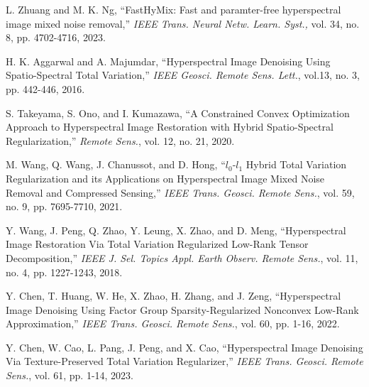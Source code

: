\begin{thebibliography}{100}
	 L. Zhuang and M. K. Ng, ``FastHyMix: Fast and paramter-free hyperspectral image mixed noise removal,'' \textit{IEEE Trans. Neural Netw. Learn. Syst.,} vol. 34, no. 8, pp. 4702-4716, 2023.
	
	
	 H. K. Aggarwal and A. Majumdar, ``Hyperspectral Image Denoising Using Spatio-Spectral Total Variation,'' \textit{IEEE Geosci. Remote Sens. Lett.}, vol.13, no. 3, pp. 442-446, 2016.
	
	 S. Takeyama, S. Ono, and I. Kumazawa, ``A Constrained Convex Optimization Approach to Hyperspectral Image Restoration with Hybrid Spatio-Spectral Regularization,'' \textit{Remote Sens.}, vol. 12, no. 21, 2020.
	
	 M. Wang, Q. Wang, J. Chanussot, and D. Hong, ``$l_0$-$l_1$ Hybrid Total Variation Regularization and its Applications on Hyperspectral Image Mixed Noise Removal and Compressed Sensing,'' \textit{IEEE Trans. Geosci. Remote Sens.}, vol. 59, no. 9, pp. 7695-7710, 2021. 
	
	 Y. Wang, J. Peng, Q. Zhao, Y. Leung, X. Zhao, and D. Meng, ``Hyperspectral Image Restoration Via Total Variation Regularized Low-Rank Tensor Decomposition,'' \textit{IEEE J. Sel. Topics Appl. Earth Observ. Remote Sens.}, vol. 11, no. 4, pp. 1227-1243, 2018.
	
	
	 Y. Chen, T. Huang, W. He, X. Zhao, H. Zhang, and J. Zeng, ``Hyperspectral Image Denoising Using Factor Group Sparsity-Regularized Nonconvex Low-Rank Approximation,'' \textit{IEEE Trans. Geosci. Remote Sens.}, vol. 60, pp. 1-16, 2022.
	
	 Y. Chen, W. Cao, L. Pang, J. Peng, and X. Cao, ``Hyperspectral Image Denoising Via Texture-Preserved Total Variation Regularizer,'' \textit{IEEE Trans. Geosci. Remote Sens.}, vol. 61, pp. 1-14, 2023.	
	

\end{thebibliography}
